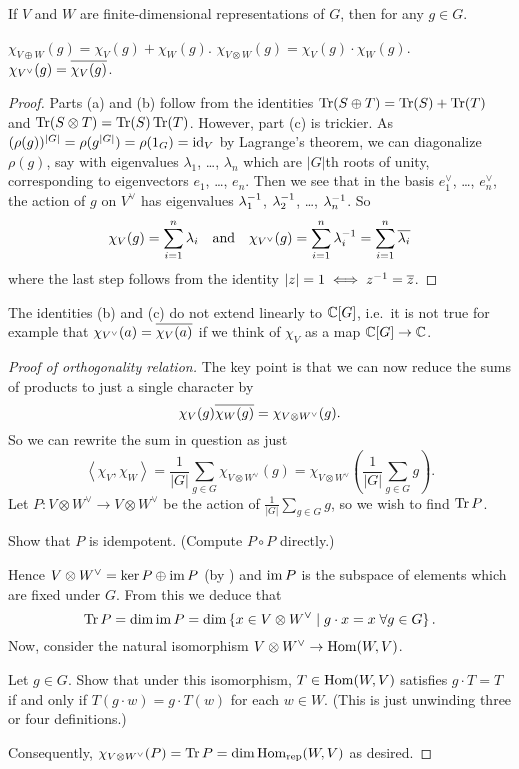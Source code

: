 \begin{theorem}
	If $V$ and $W$ are finite-dimensional representations of $G$,
	then for any $g \in G$.
	\begin{enumerate}[(a)]
		\ii $\chi_{V \oplus W}(g) = \chi_V(g) + \chi_W(g)$.
		\ii $\chi_{V \otimes W}(g) = \chi_V(g) \cdot \chi_W(g)$.
		\ii $\chi_{V^\vee}(g) = \overline{\chi_V(g)}$.
	\end{enumerate}
\end{theorem}
\begin{proof}
	Parts (a) and (b) follow from the identities
	$\operatorname{Tr}(S \oplus T) = \operatorname{Tr}(S) + \operatorname{Tr}(T)$
	and $\operatorname{Tr}(S \otimes T) = \operatorname{Tr}(S) \operatorname{Tr}(T)$.
	However, part (c) is trickier.
	As $(\rho(g))^{|G|} = \rho(g^{|G|}) = \rho(1_G) = \mathrm{id}_V$
	by Lagrange's theorem, we can diagonalize $\rho(g)$,
	say with eigenvalues $\lambda_1$, \dots, $\lambda_n$
	which are $|G|$th roots of unity,
	corresponding to eigenvectors $e_1$, \dots, $e_n$.
	Then we see that in the basis $e_1^\vee$, \dots, $e_n^\vee$,
	the action of $g$ on $V^\vee$ has eigenvalues
	$\lambda_1^{-1}$, $\lambda_2^{-1}$, \dots, $\lambda_n^{-1}$.
	So
	\[
		\chi_V(g) = \sum_{i=1}^n \lambda_i \quad\text{and}\quad
		\chi_{V^\vee}(g) = \sum_{i=1}^n \lambda_i^{-1} = \sum_{i=1}^n \overline{\lambda_i}
	\]
	where the last step follows from the identity $|z|=1 \iff z^{-1} = \overline z$.
\end{proof}
\begin{remark}
	[Warning]
	The identities (b) and (c) do not extend linearly to $\mathbb C[G]$,
	i.e.\ it is not true for example that $\chi_{V^\vee}(a) = \overline{\chi_V(a)}$
	if we think of $\chi_V$ as a map $\mathbb C[G] \to \mathbb C$.
\end{remark}
\begin{proof}
	[Proof of orthogonality relation]
	The key point is that we can now reduce
	the sums of products to just a single character by
	\[ \chi_V(g) \overline{\chi_W(g)} = \chi_{V \otimes W^\vee} (g). \]
	So we can rewrite the sum in question as just
	\[
		\left< \chi_V, \chi_W \right>
		= \frac{1}{|G|} \sum_{g \in G} \chi_{V \otimes W^\vee} (g)
		= \chi_{V \otimes W^\vee}
		\left( \frac{1}{|G|} \sum_{g \in G} g \right).
	\]
	Let $P \colon V \otimes W^\vee \to V \otimes W^\vee$ be the
	action of $\frac{1}{|G|} \sum_{g \in G} g$,
	so we wish to find $\operatorname{Tr} P$.
	\begin{exercise}
		Show that $P$ is idempotent.
		(Compute $P \circ P$ directly.)
	\end{exercise}
	Hence $V \otimes W^\vee = \ker P \oplus \operatorname{im} P$ (by )
	and $\operatorname{im} P$ is the subspace of elements which are fixed under $G$.
	From this we deduce that
	\[ \operatorname{Tr} P = \dim \operatorname{im} P =
		\dim \left\{ x \in V \otimes W^\vee
		\mid g \cdot x = x \; \forall g \in G  \right\}.
		\]
	Now, consider the natural isomorphism $V \otimes W^\vee \to \operatorname{Hom}(W, V)$.
	\begin{exercise}
		Let $g \in G$.
		Show that under this isomorphism, $T \in \operatorname{Hom}(W, V)$
		satisfies $g \cdot T = T$ if and only if
		$T(g \cdot w) = g \cdot T(w)$ for each $w \in W$.
		(This is just unwinding three or four definitions.)
	\end{exercise}
	Consequently, $\chi_{V \otimes W^\vee}(P) = \operatorname{Tr} P = \dim \operatorname{Hom}_{\mathrm{rep}}(W,V)$
	as desired.
\end{proof}

